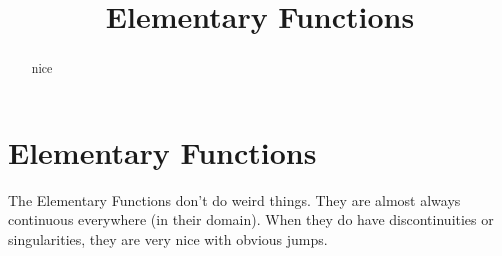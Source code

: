 \documentclass{ximera}
\title{Elementary Functions}
\begin{document}
\begin{abstract}
nice
\end{abstract}
\maketitle












\section*{Elementary Functions}




The Elementary Functions don't do weird things.  They are almost always continuous everywhere (in their domain).  When they do have discontinuities or singularities, they are very nice with obvious jumps.
\end{document}
